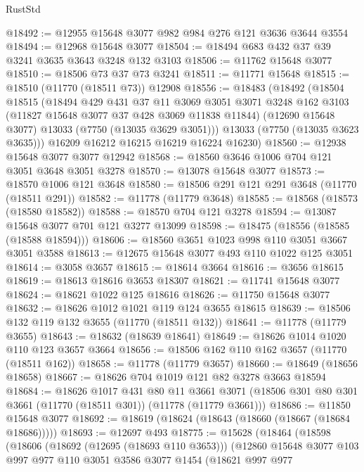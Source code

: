 \begin{lexlean}{RustStd}
\begin{coremodule}
@18492 := @12955 @15648 @3077 @982 @984 @276 @121 @3636 @3644 @3554
@18494 := @12968 @15648 @3077
@18504 := @18494 @683 @432 @37 @39 @3241 @3635 @3643 @3248 @132 @3103
@18506 := @11762 @15648 @3077
@18510 := @18506 @73 @37 @73 @3241
@18511 := @11771 @15648
@18515 := @18510 (@11770 (@18511 @73)) @12908
@18556 := @18483
    (@18492
      (@18504
        @18515
        (@18494
          @429
          @431
          @37
          @11
          @3069
          @3051
          @3071
          @3248
          @162
          @3103
          (@11827 @15648 @3077 @37 @428 @3069 @11838 @11844)
          (@12690 @15648 @3077)
          @13033
          (@7750 (@13035 @3629 @3051)))
        @13033
        (@7750 (@13035 @3623 @3635)))
      @16209
      @16212
      @16215
      @16219
      @16224
      @16230)
@18560 := @12938 @15648 @3077 @3077 @12942
@18568 := @18560 @3646 @1006 @704 @121 @3051 @3648 @3051 @3278
@18570 := @13078 @15648 @3077
@18573 := @18570 @1006 @121 @3648
@18580 := @18506 @291 @121 @291 @3648 (@11770 (@18511 @291))
@18582 := @11778 (@11779 @3648)
@18585 := @18568 (@18573 (@18580 @18582))
@18588 := @18570 @704 @121 @3278
@18594 := @13087 @15648 @3077 @701 @121 @3277 @13099
@18598 := @18475 (@18556 (@18585 (@18588 @18594)))
@18606 := @18560 @3651 @1023 @998 @110 @3051 @3667 @3051 @3588
@18613 := @12675 @15648 @3077 @493 @110 @1022 @125 @3051
@18614 := @3058 @3657
@18615 := @18614 @3664
@18616 := @3656 @18615
@18619 := @18613 @18616 @3653 @18307
@18621 := @11741 @15648 @3077
@18624 := @18621 @1022 @125 @18616
@18626 := @11750 @15648 @3077
@18632 := @18626 @1012 @1021 @119 @124 @3655 @18615
@18639 := @18506 @132 @119 @132 @3655 (@11770 (@18511 @132))
@18641 := @11778 (@11779 @3655)
@18643 := @18632 (@18639 @18641)
@18649 := @18626 @1014 @1020 @110 @123 @3657 @3664
@18656 := @18506 @162 @110 @162 @3657 (@11770 (@18511 @162))
@18658 := @11778 (@11779 @3657)
@18660 := @18649 (@18656 @18658)
@18667 := @18626 @704 @1019 @121 @82 @3278 @3663 @18594
@18684 := @18626
    @1017
    @431
    @80
    @11
    @3661
    @3071
    (@18506 @301 @80 @301 @3661 (@11770 (@18511 @301)) (@11778 (@11779 @3661)))
@18686 := @11850 @15648 @3077
@18692 := @18619 (@18624 (@18643 (@18660 (@18667 (@18684 @18686)))))
@18693 := @12697 @493
@18775 := @15628
    (@18464
      (@18598
        (@18606
          (@18692 (@12695 (@18693 @110 @3653)))
          (@12860
            @15648
            @3077
            @103
            @997
            @977
            @110
            @3051
            @3586
            @3077
            @1454
            (@18621
              @997
              @977

\end{coremodule}
\end{lexlean}
